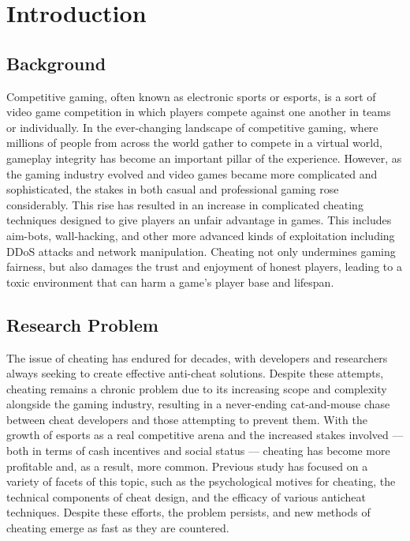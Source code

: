 \documentclass[a4paper, 12pt]{article}
\begin{document}
\newpage
\tableofcontents

\newpage

\section{Introduction}
\subsection{Background}
Competitive gaming, often known as electronic sports or esports, is a sort of video game competition in which players compete against one another in teams or individually. In the ever-changing landscape of competitive gaming, where millions of people from across the world gather to compete in a virtual world, gameplay integrity has become an important pillar of the experience. However, as the gaming industry evolved and video games became more complicated and sophisticated, the stakes in both casual and professional gaming rose considerably. This rise has resulted in an increase in complicated cheating techniques designed to give players an unfair advantage in games. This includes aim-bots, wall-hacking, and other more advanced kinds of exploitation including DDoS attacks and network manipulation. Cheating not only undermines gaming fairness, but also damages the trust and enjoyment of honest players, leading to a toxic environment that can harm a game's player base and lifespan.

\subsection{Research Problem}
The issue of cheating has endured for decades, with developers and researchers always seeking to create effective anti-cheat solutions. Despite these attempts, cheating remains a chronic problem due to its increasing scope and complexity alongside the gaming industry, resulting in a never-ending cat-and-mouse chase between cheat developers and those attempting to prevent them. With the growth of esports as a real competitive arena and the increased stakes involved — both in terms of cash incentives and social status — cheating has become more profitable and, as a result, more common. Previous study has focused on a variety of facets of this topic, such as the psychological motives for cheating, the technical components of cheat design, and the efficacy of various anticheat techniques. Despite these efforts, the problem persists, and new methods of cheating emerge as fast as they are countered.
\end{document}
